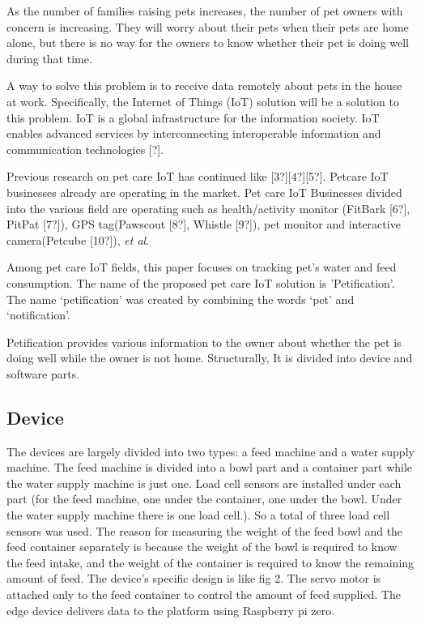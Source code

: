 \documentclass[conference]{IEEEtran}
\begin{document}
 As the number of families raising pets increases, the number of pet owners with concern is increasing. They will worry about their pets when their pets are home alone, but there is no way for the owners to know whether their pet is doing well during that time.

A way to solve this problem is to receive data remotely about pets in the house at work. Specifically, the Internet of Things (IoT) solution will be a solution to this problem. IoT is a global infrastructure for the information society. IoT enables advanced services by interconnecting interoperable information and communication technologies [?].

Previous research on pet care IoT has continued like [3?][4?][5?]. Petcare IoT businesses already are operating in the market. Pet care IoT Businesses divided into the various field are operating such as health/activity monitor (FitBark [6?], PitPat [7?]), GPS tag(Pawscout [8?], Whistle [9?]),
pet monitor and interactive camera(Petcube [10?]), \textit{et al}.

 Among pet care IoT fields, this paper focuses on tracking pet’s water and feed consumption. The name of the proposed pet care IoT solution is 'Petification'. The name ‘petification’ was created by combining the words ‘pet’ and ‘notification’.
 
Petification provides various information to the owner about whether the pet is doing well while the owner is not home. Structurally, It is divided into device and software parts.

\subsection{Device}
The devices are largely divided into two types: a feed machine and a water supply machine. The feed machine is divided into a bowl part and a container part while the water supply machine is just one. Load cell sensors are installed under each part (for the feed machine, one under the container, one under the bowl. Under the water supply machine there is one load cell.). So a total of three load cell sensors was used. The reason for measuring the weight of the feed bowl and the feed container separately is because the weight of the bowl is required to know the feed intake, and the weight of the container is required to know the remaining amount of feed. The device's specific design is like fig 2. The servo motor is attached only to the feed container to control the amount of feed supplied. The edge device delivers data to the platform using Raspberry pi zero.
\end{document}
